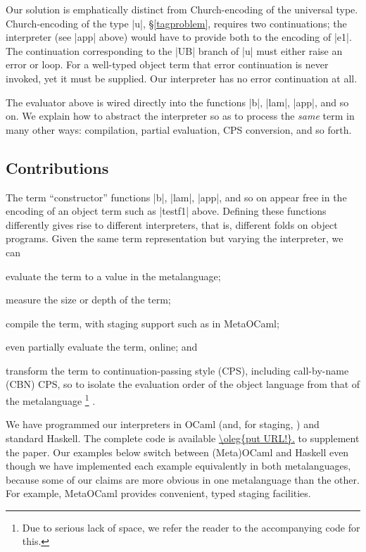 Our solution is emphatically distinct from Church-encoding of the
universal type. Church-encoding of the type |u|, \S\ref{tagproblem},
requires two continuations; the interpreter (see |app| above) would
have to provide both to the encoding of |e1|. The continuation
corresponding to the |UB| branch of |u| must either raise an error or
loop. For a well-typed object term that error continuation is never
invoked, yet it must be supplied. Our interpreter has no error
continuation at all.

The evaluator above is wired directly into the
functions |b|, |lam|, |app|, and so on.  %
We explain how to abstract the interpreter so as
to process the \emph{same} term in many other
ways: compilation, partial evaluation, CPS
conversion, and so forth.

\subsection{Contributions}\label{contributions}

The term ``constructor'' functions |b|, |lam|, |app|, and so on appear
free in the encoding of an object term such as |testf1| above.  Defining
these functions differently gives rise to different interpreters, that
is, different folds on object programs.  Given the same term
representation but varying the interpreter, we can
\begin{itemize*}
    \item evaluate the term to a value in the metalanguage;
    \item measure the size or depth of the term;
    \item compile the term, with staging support such as in MetaOCaml;
    \item even partially evaluate the term, online; and
    \item transform the term to continuation\hyp passing style (CPS),
        including call-by-name (CBN) CPS, so to isolate the evaluation
        order of the object language from that of the metalanguage
\footnote{Due to serious lack of space, 
we refer the reader to the accompanying code for this.}%
.
\end{itemize*}
We have programmed our interpreters in OCaml (and, for staging,
\cite{metaocaml}) and standard Haskell. The complete code is available
\url{\oleg{put URL!}.}
to supplement the paper. Our examples below switch between (Meta)OCaml
and Haskell even though we have implemented each example equivalently in
both metalanguages, because some of our claims are more obvious in one
metalanguage than the other.  For example, MetaOCaml provides
convenient, typed staging facilities.

